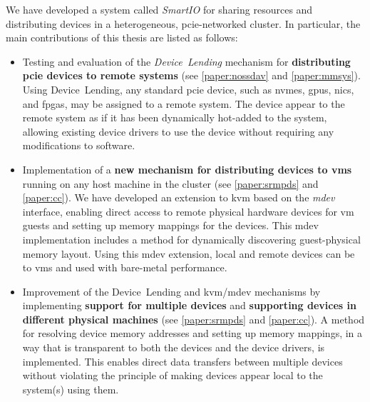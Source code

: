 We have developed a system called \emph{SmartIO} for sharing resources and distributing devices in a heterogeneous, \gls{pcie}-networked cluster.
%
In particular, the main contributions of this thesis are listed as follows:
\begin{itemize}
    \item Testing and evaluation of the \emph{Device~Lending} mechanism for \textbf{distributing \gls{pcie} devices to remote systems} (see \cref{paper:nossdav} and \cref{paper:mmsys}). Using Device~Lending, any standard \gls{pcie} device, such as \glspl{nvme}, \glspl{gpu}, \glspl{nic}, and \glspl{fpga}, may be assigned to a remote system. The device appear to the remote system as if it has been dynamically hot-added to the system, allowing existing device drivers to use the device without requiring any modifications to software.

    \item Implementation of a \textbf{new mechanism for distributing devices to \glspl{vm}} running on any host machine in the cluster (see \cref{paper:srmpds} and \cref{paper:cc}). We have developed an extension to \gls{kvm} based on the \emph{\gls{mdev}} interface, enabling direct access to remote physical hardware devices for \gls{vm} guests and setting up memory mappings for the devices. This \gls{mdev} implementation includes a method for dynamically discovering guest-physical memory layout. Using this \gls{mdev} extension, local and remote devices can be  to \glspl{vm} and used with bare-metal performance.
	
    \item Improvement of the Device~Lending and \gls{kvm}/\gls{mdev} mechanisms by implementing \textbf{support for multiple devices} and \textbf{supporting devices in different physical machines} (see \cref{paper:srmpds} and \cref{paper:cc}). A method for resolving device memory addresses and setting up memory mappings, in a way that is transparent to both the devices and the device drivers, is implemented. This enables direct data transfers between multiple devices without violating the principle of making devices appear local to the system(s) using them.


\end{itemize}
